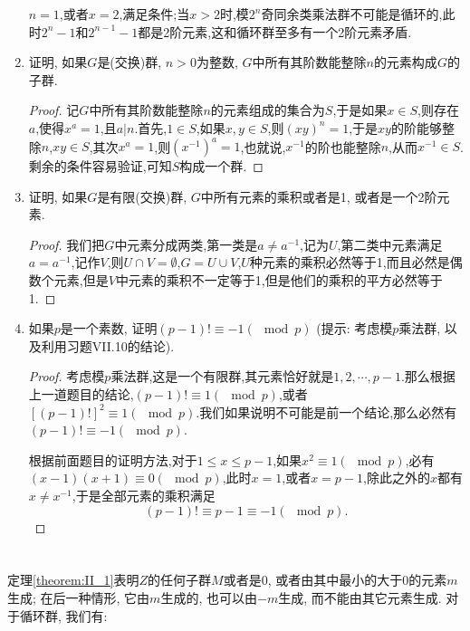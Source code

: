 \documentclass[12pt,a4paper]{book} %
\theoremstyle{remark}
\theoremstyle{example}
\theoremstyle{lemma}
\theoremstyle{corollary}
\numberwithin{theorem}{chapter}
\begin{document}
\begin{enumerate}
$n=1$,或者$x=2$,满足条件;当$x>2$时,模$2^n$奇同余类乘法群不可能是循环的,此时$2^n-1$和$2^{n-1}-1$都是2阶元素,这和循环群至多有一个2阶元素矛盾.

\item 证明, 如果$G$是(交换)群, $n > 0$为整数, $G$中所有其阶数能整除$n$的元素构成$G$的子群.

\begin{proof}
记$G$中所有其阶数能整除$n$的元素组成的集合为$S$,于是如果$x \in S$,则存在$a$,使得$x^a =1$,且$a|n$.首先,$1 \in S$,如果$x,y\in S$,则$(xy)^n=1$,于是$xy$的阶能够整除$n$,$xy \in S$,其次$x^a=1$,则$(x^{-1})^a=1$,也就说,$x^{-1}$的阶也能整除$n$,从而$x^{-1} \in S$.剩余的条件容易验证,可知$S$构成一个群.
\end{proof}

\item 证明, 如果$G$是有限(交换)群, $G$中所有元素的乘积或者是1, 或者是一个2阶元素.

\begin{proof}
我们把$G$中元素分成两类,第一类是$a \neq a^{-1}$,记为$U$,第二类中元素满足$a = a^{-1}$,记作$V$,则$U \cap V = \emptyset$,$G=U \cup V$,$U$种元素的乘积必然等于1,而且必然是偶数个元素,但是$V$中元素的乘积不一定等于1,但是他们的乘积的平方必然等于1.
\end{proof}

\item 如果$p$是一个素数, 证明$(p - 1)! \equiv -1 (\mod p)$ (提示: 考虑模$p$乘法群, 以及利用习题VII.10的结论).

\begin{proof}
考虑模$p$乘法群,这是一个有限群,其元素恰好就是$1,2,\cdots,p-1$.那么根据上一道题目的结论,$(p-1)!\equiv 1(\mod{p})$,或者$[(p-1)!]^2 \equiv 1(\mod{p})$.我们如果说明不可能是前一个结论,那么必然有$(p-1)!\equiv -1(\mod{p})$.

根据前面题目的证明方法,对于$1 \le x \le p-1$,如果$x^2 \equiv 1 (\mod{p})$,必有$(x-1)(x+1)\equiv0(\mod{p})$,此时$x=1$,或者$x=p-1$,除此之外的$x$都有$x \neq x^{-1}$,于是全部元素的乘积满足
\[
(p-1)! \equiv p-1 \equiv -1(\mod{p}).
\]
\end{proof}
\end{enumerate}

\chapter{} \label{chapter:8}
定理\ref{theorem:II_1}表明$Z$的任何子群$M$或者是0, 或者由其中最小的大于0的元素$m$生成; 在后一种情形, 它由$m$生成的, 也可以由$-m$生成, 而不能由其它元素生成. 对于循环群, 我们有:
\end{document}
